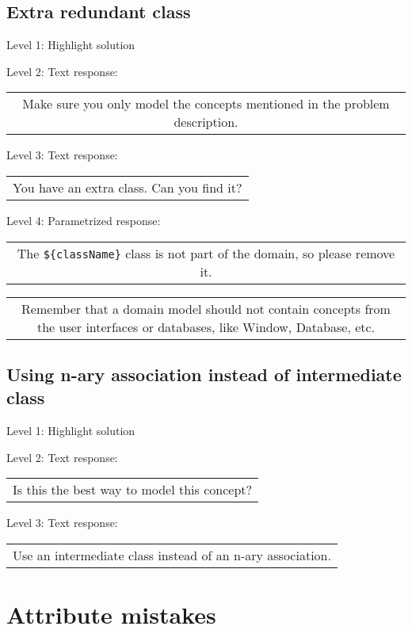 \subsection{Extra redundant class}

\noindent Level 1: Highlight solution \medskip

\noindent Level 2: Text response: \medskip

\begin{tabular}{|c}
Make sure you only model the concepts mentioned in the problem description.
\end{tabular} \medskip

\noindent Level 3: Text response: \medskip

\begin{tabular}{|c}
You have an extra class. Can you find it?
\end{tabular} \medskip

\noindent Level 4: Parametrized response: \medskip

\begin{tabular}{|c}
The \verb|${className}| class is not part of the domain, so please remove it.
\end{tabular} \medskip

\begin{tabular}{|c}
Remember that a domain model should not contain concepts from the user interfaces or databases, like Window, Database, etc.
\end{tabular} \medskip


\subsection{Using n-ary association instead of intermediate class}

\noindent Level 1: Highlight solution \medskip

\noindent Level 2: Text response: \medskip

\begin{tabular}{|c}
Is this the best way to model this concept?
\end{tabular} \medskip

\noindent Level 3: Text response: \medskip

\begin{tabular}{|c}
Use an intermediate class instead of an n-ary association.
\end{tabular} \medskip



\section{Attribute mistakes}

